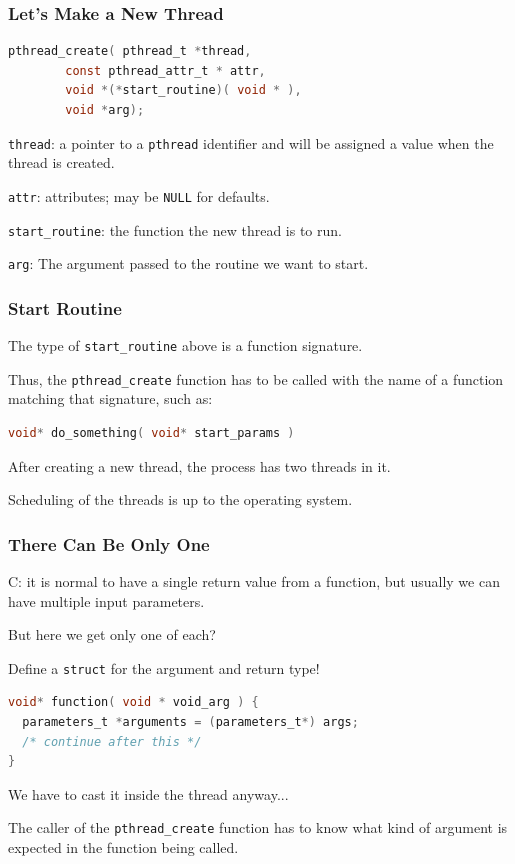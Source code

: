 \begin{frame}[fragile]
	\frametitle{Let's Make a New Thread}

	\begin{lstlisting}[language=C]
pthread_create( pthread_t *thread, 
		const pthread_attr_t * attr, 
		void *(*start_routine)( void * ), 
		void *arg);
\end{lstlisting}

	\texttt{thread}: a pointer to a \texttt{pthread} identifier and will be assigned a value when the thread is created.

	\texttt{attr}: attributes; may be \texttt{NULL} for defaults.

	\texttt{start\_routine}: the function the new thread is to run.

	\texttt{arg}: The argument passed to the routine we want to start.

\end{frame}


\begin{frame}[fragile]
	\frametitle{Start Routine}

	The type of \texttt{start\_routine} above is a function signature.

	Thus, the \texttt{pthread\_create} function has to be called with the name of a function matching that signature, such as:

	\begin{lstlisting}[language=C]
void* do_something( void* start_params )
\end{lstlisting}

	After creating a new thread, the process has two threads in it.

	Scheduling of the threads is up to the operating system.

\end{frame}


\begin{frame}[fragile]
	\frametitle{There Can Be Only One}

	C: it is normal to have a single return value from a function, but usually we can have multiple input parameters.

	But here we get only one of each?

	Define a \texttt{struct} for the argument and return type!

	\begin{lstlisting}[language=C]
void* function( void * void_arg ) {
  parameters_t *arguments = (parameters_t*) args;
  /* continue after this */
}
\end{lstlisting}

	We have to cast it inside the thread anyway...

	The caller of the \texttt{pthread\_create} function has to know what kind of argument is expected in the function being called.

\end{frame}


